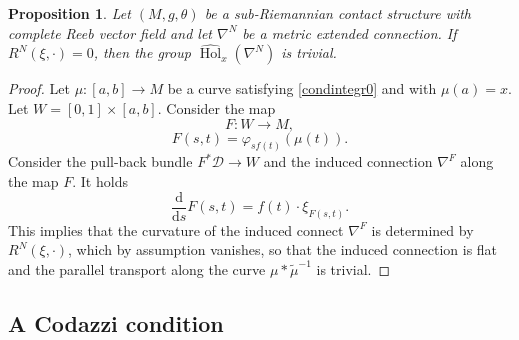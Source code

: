 \documentclass{amsart}
\theoremstyle{plain}
\newtheorem{prop}[theorem]{Proposition}
\theoremstyle{definition}
\newcommand{\Hol}{\operatorname{Hol}}
\newcommand{\Or}{\operatorname{O}}
\def\so{\mathfrak{so}}
\def\ff{\mathfrak{f}}
\newcommand{\1}{\mathbf{1}}
\newcommand{\D}{{\mathcal D}}
\renewcommand{\d}{\mathrm{d}}
\newcommand{\+}{\oplus}
\begin{document}


\begin{prop}\label{propHhatistrivial} 
Let $(M,g,\theta)$ be a sub-Riemannian contact structure with complete Reeb vector field and let $\nabla^N$ be a metric extended connection.
If $R^N(\xi,\cdot)=0$, then the group $\widehat{\Hol}_x(\nabla^N)$ is trivial.
\end{prop}

\begin{proof}
Let $\mu:[a,b]\to M$ be a curve satisfying \eqref{condintegr0} and with $\mu(a)=x$. Let $W=[0,1]\times [a,b]$. Consider the map
$$F:W\to M,$$
$$F(s,t)=\varphi_{sf(t)}(\mu(t)).$$
Consider the pull-back bundle $F^*\D\to W$ and the induced connection $\nabla^F$ along the map $F$. It holds $$\frac{\d}{\d s}F(s,t)=f(t)\cdot\xi_{F(s,t)}.$$
This implies that the curvature of the induced connect $\nabla^F$ is determined by 
$R^N(\xi,\cdot)$, which by assumption vanishes, so that the induced connection is flat and the parallel transport along the curve $\mu*\tilde\mu^{-1}$ is trivial. \end{proof}



  










\subsection{A Codazzi condition}
\end{document}
